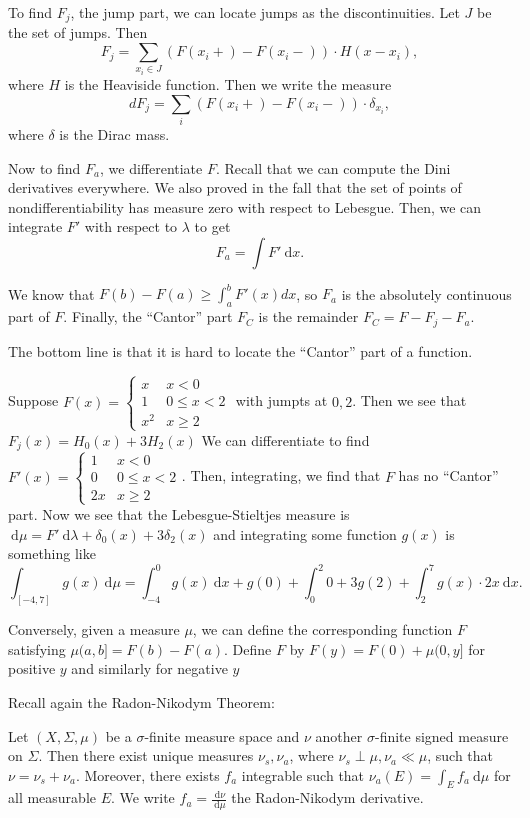 \documentclass[10pt, twoside]{article}
\renewcommand{\d}{\ \mathrm{d}}
\begin{document}
   To find $F_j$, the jump part, we can locate jumps as the discontinuities. Let $J$ be the set of jumps. Then \[ F_j = \sum_{x_i \in J} (F(x_i+) - F(x_i-))\cdot H(x-x_i), \] where $H$ is the Heaviside function. Then we write the measure \[dF_j = \sum_i (F(x_i+) - F(x_i-)) \cdot \delta_{x_i},\] where $\delta$ is the Dirac mass.

    Now to find $F_a$, we differentiate $F$. Recall that we can compute the Dini derivatives everywhere. We also proved in the fall that the set of points of nondifferentiability has measure zero with respect to Lebesgue. Then, we can integrate $F'$ with respect to $\lambda$ to get \[F_a = \int F' \d x.\]

    We know that $F(b) - F(a) \geq \int_a^b F'(x) dx$, so $F_a$ is the absolutely continuous part of $F$. Finally, the ``Cantor'' part $F_C$ is the remainder $F_C = F-F_j-F_a$.
    
    The bottom line is that it is hard to locate the ``Cantor'' part of a function.
    
    \begin{exm}
        Suppose $F(x) = \begin{cases}
            x & x < 0 \\
            1 & 0 \leq x < 2 \\
            x^2 & x \geq 2
        \end{cases}$ with jumpts at $0,2$. Then we see that $F_j(x) = H_0(x) + 3H_2(x)$ We can differentiate to find $F'(x) = \begin{cases}
            1 & x < 0 \\
            0 & 0 \leq x < 2 \\
            2x & x \geq 2
        \end{cases}$. Then, integrating, we find that $F$ has no ``Cantor'' part. Now we see that the Lebesgue-Stieltjes measure is $\d \mu = F' \d \lambda + \delta_0(x) + 3 \delta_2(x)$ and integrating some function $g(x)$ is something like \[\int_{[-4,7]}g(x) \d\mu = \int_{-4}^0 g(x) \d x + g(0) + \int_0^2 0 + 3g(2) + \int_2^7 g(x)\cdot 2x \d x.\]
    \end{exm}
    
    Conversely, given a measure $\mu$, we can define the corresponding function $F$ satisfying $\mu(a,b] = F(b) - F(a)$. Define $F$ by $F(y) = F(0) + \mu(0,y]$ for positive $y$ and similarly for negative $y$

    Recall again the Radon-Nikodym Theorem:
    \begin{thm}
        Let $(X, \Sigma, \mu)$ be a $\sigma$-finite measure space and $\nu$ another $\sigma$-finite signed measure on $\Sigma$. Then there exist unique measures $\nu_s, \nu_a$, where $\nu_s \perp \mu, \nu_a \ll \mu$, such that $\nu = \nu_s + \nu_a$. Moreover, there exists $f_a$ integrable such that $\nu_a(E) = \int_E f_a \d\mu$ for all measurable $E$. We write $f_a = \frac{\d\nu}{\d\mu}$ the Radon-Nikodym derivative.
    \end{thm}
\end{document}
